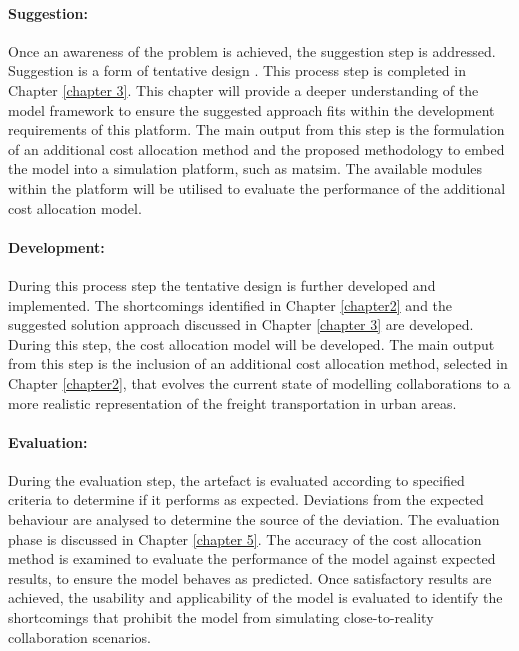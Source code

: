 \paragraph{Suggestion:} Once an awareness of the problem is achieved, the suggestion step is addressed. Suggestion is a form of tentative design \citep{alfrijat2009a,vaishnavi2004design}. This process step is completed in Chapter \ref{chapter 3}. This chapter will provide a deeper understanding of the model framework to ensure the suggested approach fits within the development requirements of this platform. The main output from this step is the formulation of an additional cost allocation method and the proposed methodology to embed the model into a simulation platform, such as \acrshort{matsim}. The available modules within the platform will be utilised to evaluate the performance of the additional cost allocation model. 

\paragraph{Development:} During this process step the tentative design is further developed and implemented. The shortcomings identified in Chapter \ref{chapter2} and the suggested solution approach discussed in Chapter \ref{chapter 3} are developed.
During this step, the cost allocation model will be developed. The main output from this step is the inclusion of an additional cost allocation method, selected in Chapter \ref{chapter2}, that evolves the current state of modelling collaborations to a more realistic representation of the freight transportation in urban areas.\par

\paragraph{Evaluation:} During the evaluation step, the artefact is evaluated according to specified criteria to determine if it performs as expected. Deviations from the expected behaviour are analysed to determine the source of the deviation. The evaluation phase is discussed in Chapter \ref{chapter 5}. The accuracy of the cost allocation method is examined to evaluate the performance of the model against expected results, to ensure the model behaves as predicted. Once satisfactory results are achieved, the usability and applicability of the model is evaluated to identify the shortcomings that prohibit the model from simulating close-to-reality collaboration scenarios.

